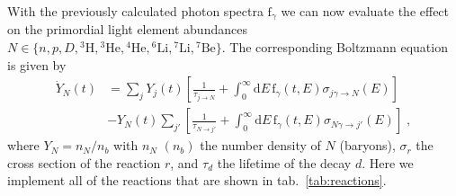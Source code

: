 \documentclass[11pt,a4paper]{article}
\newcommand{\fpdi}{\mathrm{f}}
\newcommand{\eqsp}{\;}
\begin{document}
With the previously calculated photon spectra $\fpdi_\gamma$ we can now evaluate the effect on the primordial light element abundances $N \in \{n, p, D, {}^3\mathrm{H}, {}^3\mathrm{He}, {}^4\mathrm{He}, {}^6\mathrm{Li}, {}^7\mathrm{Li}, {}^7\mathrm{Be} \}$. The corresponding Boltzmann equation is given by
\begin{align}
\dot{Y}_N(t) & = \sum_{j} Y_{j}(t) \left[\frac{1}{\tau_{j\rightarrow N}} + \int_{0}^{\infty} \text{d} E \, \fpdi_\gamma(t, E)\sigma_{j\gamma \rightarrow N}(E) \right] \nonumber \\
& - Y_N(t) \sum_{j'} \left[\frac{1}{\tau_{N\rightarrow j'}} + \int_{0}^{\infty} \text{d} E \, \fpdi_\gamma(t, E)\sigma_{N\gamma \rightarrow j'}(E) \right]\eqsp,
\label{eq:y_pdi}
\end{align}
where $Y_N = n_N / n_b$ with $n_N$ $(n_b)$ the number density of $N$ (baryons), $\sigma_r$ the cross section of the reaction $r$, and $\tau_d$ the lifetime of the decay $d$. Here we implement all of the reactions that are shown in tab.~\ref{tab:reactions}.
\end{document}
